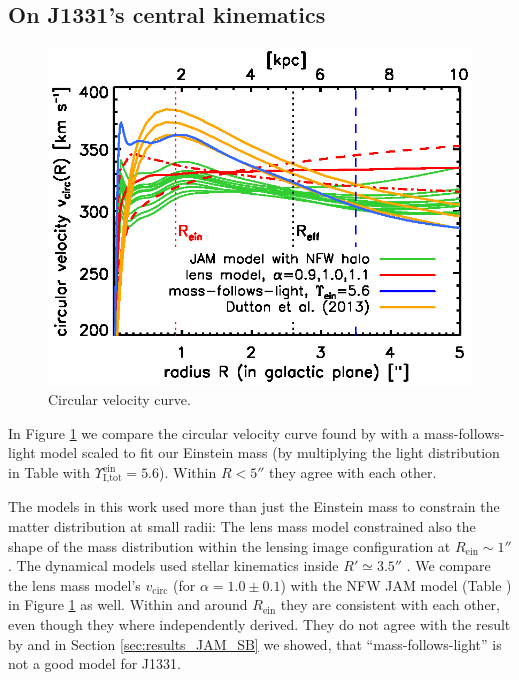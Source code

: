 \subsection{On J1331's central kinematics}

\begin{figure}
\centering
  \includegraphics[width=0.9\linewidth]{fig/B4_jam_profiles_errors_short_vcirc.ps}
  \caption{Circular velocity curve. }
  \label{fig:vcirc_comparison}
\end{figure}

In Figure \ref{fig:vcirc_comparison} we compare the circular velocity curve found by \citet{SWELLSV} with a mass-follows-light model scaled to fit our Einstein mass (by multiplying the light distribution in Table \Wilma{[TO DO]} with $\Upsilon_\text{I,tot}^\text{ein} = 5.6$). Within $R < 5''$ they agree with each other. 

The models in this work used more than just the Einstein mass to constrain the matter distribution at small radii: The lens mass model constrained also the shape of the mass distribution within the lensing image configuration at $R_\text{ein} \sim 1''$. The dynamical models used stellar kinematics inside $R' \simeq 3.5''$ \Wilma{[TO DO: Check]}. We compare the lens mass model's $v_\text{circ}$ (for $\alpha=1.0\pm 0.1$) with the NFW JAM model (Table \Wilma{[TO DO]}) in Figure \ref{fig:vcirc_comparison} as well. Within and around $R_\text{ein}$ they are consistent with each other, even though they where independently derived. They do not agree with the result by \citet{SWELLSV} and in Section \ref{sec:results_JAM_SB} we showed, that ``mass-follows-light'' is not a good model for J1331.

